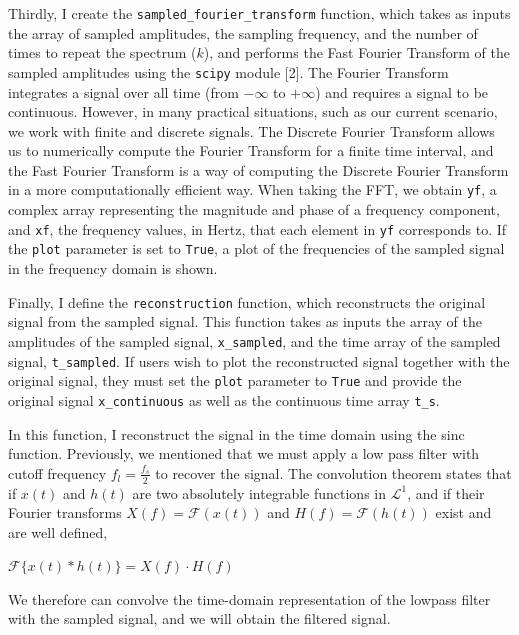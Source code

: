 \documentclass{article}
\begin{document}
Thirdly, I create the \verb|sampled_fourier_transform| function, which takes as inputs the array of sampled amplitudes, the sampling frequency, and the number of times to repeat the spectrum ($k$), 
and performs the Fast Fourier Transform of the sampled amplitudes using the \verb|scipy| module [2].
The Fourier Transform integrates a signal over all time (from $-\infty$ to $+\infty$) and requires a signal to be continuous. 
However, in many practical situations, such as our current scenario, we work with finite and discrete signals. 
The Discrete Fourier Transform allows us to numerically compute the Fourier Transform for a finite time interval, 
and the Fast Fourier Transform is a way of computing the Discrete Fourier Transform in a more computationally efficient way. 
When taking the FFT, we obtain \verb|yf|, a complex array representing the magnitude and phase of a frequency component, 
and \verb|xf|, the frequency values, in Hertz, that each element in \verb|yf| corresponds to. 
If the \verb|plot| parameter is set to \verb|True|, a plot of the frequencies of the sampled signal in the frequency domain is shown.

Finally, I define the \verb|reconstruction| function, which reconstructs the original signal from the sampled signal.
This function takes as inputs the array of the amplitudes of the sampled signal, \verb|x_sampled|, and the time array of the sampled signal, \verb|t_sampled|.
If users wish to plot the reconstructed signal together with the original signal, they must set the \verb|plot| parameter to \verb|True| and provide the original signal \verb|x_continuous| as well as the continuous time array \verb|t_s|.

\noindent In this function, I reconstruct the signal in the time domain using the sinc function.
Previously, we mentioned that we must apply a low pass filter with cutoff frequency $f_l = \frac{f_s}{2}$ to recover the signal.
The convolution theorem states that if $x(t)$ and $h(t)$ are two absolutely integrable functions in $\mathcal{L}^1$, and if their Fourier transforms $X(f) = \mathcal{F}(x(t))$ and $H(f) = \mathcal{F}(h(t))$ exist and are well defined,
\begin{center}
    \begin{math}
       \displaystyle \mathcal{F}\{ x(t) * h(t) \} = X(f) \cdot H(f)
    \end{math}
\end{center}
We therefore can convolve the time-domain representation of the lowpass filter with the sampled signal, and we will obtain the filtered signal.
\end{document}
